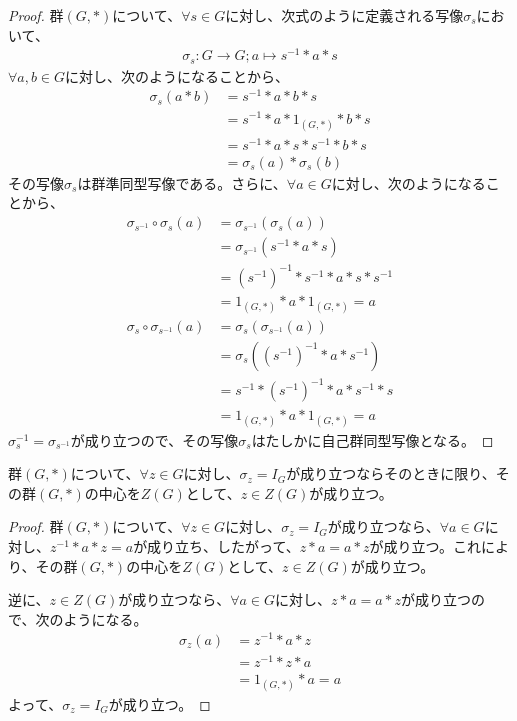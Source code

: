 \documentclass[dvipdfmx]{jsarticle}
\begin{document}
\begin{proof}
群$(G,*)$について、$\forall s \in G$に対し、次式のように定義される写像$\sigma_{s}$において、
\begin{align*}
\sigma_{s}:G \rightarrow G;a \mapsto s^{- 1}*a*s
\end{align*}
$\forall a,b \in G$に対し、次のようになることから、
\begin{align*}
\sigma_{s}(a*b) &= s^{- 1}*a*b*s\\
&= s^{- 1}*a*1_{(G,*)}*b*s\\
&= s^{- 1}*a*s*s^{- 1}*b*s\\
&= \sigma_{s}(a)*\sigma_{s}(b)
\end{align*}
その写像$\sigma_{s}$は群準同型写像である。さらに、$\forall a \in G$に対し、次のようになることから、
\begin{align*}
\sigma_{s^{- 1}} \circ \sigma_{s}(a) &= \sigma_{s^{- 1}}\left( \sigma_{s}(a) \right)\\
&= \sigma_{s^{- 1}}\left( s^{- 1}*a*s \right)\\
&= \left( s^{- 1} \right)^{- 1}*s^{- 1}*a*s*s^{- 1}\\
&= 1_{(G,*)}*a*1_{(G,*)} = a\\
\sigma_{s} \circ \sigma_{s^{- 1}}(a) &= \sigma_{s}\left( \sigma_{s^{- 1}}(a) \right)\\
&= \sigma_{s}\left( \left( s^{- 1} \right)^{- 1}*a*s^{- 1} \right)\\
&= s^{- 1}*\left( s^{- 1} \right)^{- 1}*a*s^{- 1}*s\\
&= 1_{(G,*)}*a*1_{(G,*)} = a
\end{align*}
$\sigma_{s}^{- 1} = \sigma_{s^{- 1}}$が成り立つので、その写像$\sigma_{s}$はたしかに自己群同型写像となる。
\end{proof}
\begin{thm}\label{3.1.3.3}
群$(G,*)$について、$\forall z \in G$に対し、$\sigma_{z} = I_{G}$が成り立つならそのときに限り、その群$(G,*)$の中心を$Z(G)$として、$z \in Z(G)$が成り立つ。
\end{thm}
\begin{proof}
群$(G,*)$について、$\forall z \in G$に対し、$\sigma_{z} = I_{G}$が成り立つなら、$\forall a \in G$に対し、$z^{- 1}*a*z = a$が成り立ち、したがって、$z*a = a*z$が成り立つ。これにより、その群$(G,*)$の中心を$Z(G)$として、$z \in Z(G)$が成り立つ。\par
逆に、$z \in Z(G)$が成り立つなら、$\forall a\in G$に対し、$z*a=a*z$が成り立つので、次のようになる。
\begin{align*}
  \sigma_z (a) &=z^{-1} *a*z \\
  &=z^{-1} *z*a\\
  &=1_{(G,*)} *a=a
\end{align*}
よって、$\sigma_{z} = I_{G}$が成り立つ。
\end{proof}
\end{document}
